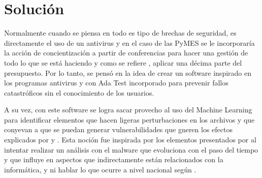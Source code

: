 \pagebreak
\section{Solución}
Normalmente cuando se piensa en todo es tipo de brechas de seguridad, es
directamente el uso de un antivirus y en el caso de las PyMES se le
incorporaría la acción de concientización a partir de conferencias para hacer
una gestión de todo lo que se está haciendo y como se refiere
\textcite{Bueno2022}, aplicar una décima parte del presupuesto. Por lo tanto,
se pensó en la idea de crear un software inspirado en los programas antivirus
y con Ada Test incorporado para prevenir fallos catastróficos sin el
conocimiento de los usuarios.

A su vez, con  este software se logra sacar provecho al uso del Machine Learning
para identificar elementos que hacen ligeras perturbaciones en los archivos y
que conyevan a que se puedan generar vulnerabilidades que gneren los efectos
explicados por \textcite{Mosquera2019} y \textcite{Rosli2019}. Esta noción
fue inspirada por los elementos presentados por \textcite{Aboaoja2022} al
intentar realizar un análisis con el malware que evoluciona con el paso del
tiempo y que influye en aspectos que indirectamente están relacionados con la
informática, y ni hablar lo que ocurre a nivel nacional según
\textcite{CanoMartinez2022}.
